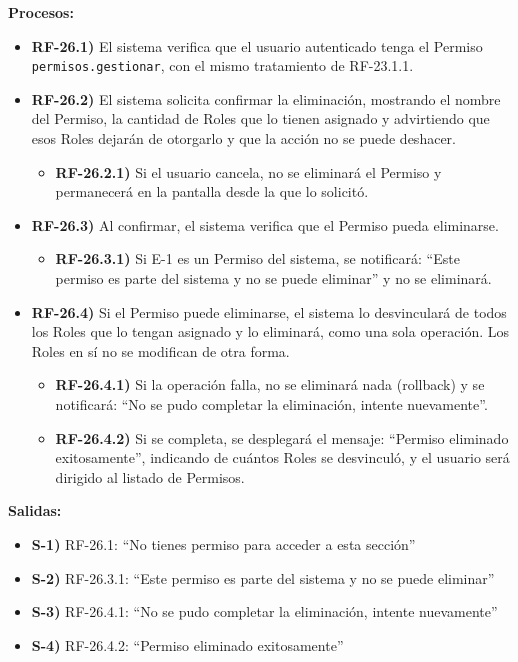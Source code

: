 \textbf{Procesos:}
\begin{itemize}[label={}, leftmargin=1.5em]
  \item \textbf{RF-26.1)} El sistema verifica que el usuario autenticado tenga el Permiso \texttt{permisos.gestionar}, con el mismo tratamiento de RF-23.1.1.
  \item \textbf{RF-26.2)} El sistema solicita confirmar la eliminaci\'on, mostrando el nombre del Permiso, la cantidad de Roles que lo tienen asignado y advirtiendo que esos Roles dejar\'an de otorgarlo y que la acci\'on no se puede deshacer.
  \begin{itemize}[label={}, leftmargin=1.5em]
    \item \textbf{RF-26.2.1)} Si el usuario cancela, no se eliminar\'a el Permiso y permanecer\'a en la pantalla desde la que lo solicit\'o.
  \end{itemize}
  \item \textbf{RF-26.3)} Al confirmar, el sistema verifica que el Permiso pueda eliminarse.
  \begin{itemize}[label={}, leftmargin=1.5em]
    \item \textbf{RF-26.3.1)} Si E-1 es un Permiso del sistema, se notificar\'a: ``Este permiso es parte del sistema y no se puede eliminar'' y no se eliminar\'a.
  \end{itemize}
  \item \textbf{RF-26.4)} Si el Permiso puede eliminarse, el sistema lo desvincular\'a de todos los Roles que lo tengan asignado y lo eliminar\'a, como una sola operaci\'on. Los Roles en s\'i no se modifican de otra forma.
  \begin{itemize}[label={}, leftmargin=1.5em]
    \item \textbf{RF-26.4.1)} Si la operaci\'on falla, no se eliminar\'a nada (rollback) y se notificar\'a: ``No se pudo completar la eliminaci\'on, intente nuevamente''.
    \item \textbf{RF-26.4.2)} Si se completa, se desplegar\'a el mensaje: ``Permiso eliminado exitosamente'', indicando de cu\'antos Roles se desvincul\'o, y el usuario ser\'a dirigido al listado de Permisos.
  \end{itemize}
\end{itemize}

\textbf{Salidas:}
\begin{itemize}[label={}, leftmargin=1.5em]
  \item \textbf{S-1)} RF-26.1: ``No tienes permiso para acceder a esta secci\'on''
  \item \textbf{S-2)} RF-26.3.1: ``Este permiso es parte del sistema y no se puede eliminar''
  \item \textbf{S-3)} RF-26.4.1: ``No se pudo completar la eliminaci\'on, intente nuevamente''
  \item \textbf{S-4)} RF-26.4.2: ``Permiso eliminado exitosamente''
\end{itemize}
